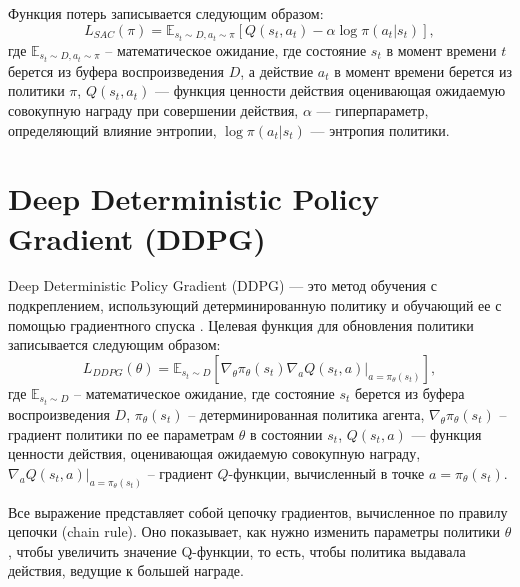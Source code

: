 Функция потерь записывается следующим образом:
\begin{equation}
L_{SAC}(\pi) = \mathbb{E}_{s_t \sim D, a_t \sim \pi} \left[ Q(s_t, a_t) - \alpha \log \pi(a_t|s_t) \right],
\end{equation}
где 
$\mathbb{E}_{s_t \sim D, a_t \sim \pi}$ -- математическое ожидание, где состояние $s_t$ в момент времени $t$ берется из буфера воспроизведения $D$,
а действие $a_t$ в момент времени берется из политики $\pi$,
$Q(s_t, a_t)$ — функция ценности действия оценивающая ожидаемую совокупную награду при совершении действия, 
$\alpha$ — гиперпараметр, определяющий влияние энтропии, 
$\log \pi(a_t|s_t)$ — энтропия политики.

\section{Deep Deterministic Policy Gradient (DDPG)}
Deep Deterministic Policy Gradient (DDPG) — это метод обучения с подкреплением, 
использующий детерминированную политику и обучающий ее с помощью градиентного спуска \cite{lib:rlmethods}. 
Целевая функция для обновления политики записывается следующим образом:
\begin{equation}
L_{DDPG}(\theta) = \mathbb{E}_{s_t \sim D} \left[ \nabla_\theta \pi_\theta(s_t) \nabla_a Q(s_t, a)|_{a=\pi_\theta(s_t)} \right],
\end{equation}
где 
$\mathbb{E}_{s_t \sim D}$ -- математическое ожидание, где состояние $s_t$ берется из буфера воспроизведения $D$,
$\pi_\theta(s_t)$ -- детерминированная политика агента,
$\nabla_\theta \pi_\theta(s_t)$ -- градиент политики по ее параметрам $\theta$ в состоянии $s_t$,
$Q(s_t, a)$ — функция ценности действия, оценивающая ожидаемую совокупную награду,
$\nabla_a Q(s_t, a)|_{a=\pi_\theta(s_t)}$ -- градиент $Q$-функции, вычисленный в точке $a=\pi_\theta(s_t)$.

Все выражение представляет собой цепочку градиентов, вычисленное по правилу цепочки (chain rule). 
Оно показывает, как нужно изменить параметры политики $\theta$,
чтобы увеличить значение Q-функции, то есть, чтобы политика выдавала действия, ведущие к большей награде.

